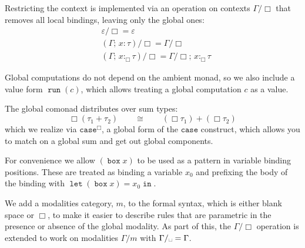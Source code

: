 \documentclass[acmsmall, screen, review, anonymous]{acmart}
\theoremstyle{definition}
\newcommand{\glob}{\mathop{\Box}}
\newcommand{\nothing}{\text{\textvisiblespace}}
\newcommand{\casename}{\mathtt{case}}
\newcommand{\caseboxname}{\casename^{\Box}}
\newcommand{\types}{\mathrel{:}}
\newcommand{\gtypes}{\mathrel{:_{\Box}}}
\newcommand{\cempty}{\varepsilon}
\newcommand{\ccons}[2]{#1;\,#2}
\newcommand{\lbind}[3]{\ccons{#1}{#2\types#3}}
\newcommand{\gbind}[3]{\ccons{#1}{#2\gtypes#3}}
\newcommand{\cdiv}[1]{#1/\Box}
\newcommand{\cmdiv}[1]{#1/m}
\newcommand{\cldiv}[1]{#1/\nothing}
\newcommand{\gboxname}{\mathop{\mathtt{box}}}
\newcommand{\gbox}[1]{\gboxname #1}
\newcommand{\gunbox}[3]{\mathop{\mathtt{let}} (\gbox{#1}) = #2 \mathop{\mathtt{in}} #3}
\newcommand{\grunname}{\mathtt{run}}
\newcommand{\grun}[1]{\mathop{\grunname}(#1)}
\begin{document}
Restricting the context is implemented via an operation on contexts
$\cdiv{\Gamma}$ that removes all local bindings, leaving only the global
ones:
\begin{align*}
  &\cdiv{\cempty} = \cempty \\
  &\cdiv{(\lbind{\Gamma}{x}{\tau})} = \cdiv{\Gamma} \\
  &\cdiv{(\gbind{\Gamma}{x}{\tau})} = \gbind{\cdiv{\Gamma}}{x}{\tau}
\end{align*}

Global computations do not depend on the ambient monad, so we also
include a value form $\grun{c}$, which allows treating a global
computation $c$ as a value.

The global comonad distributes over sum types:
\begin{equation*}
  \glob (\tau_1 + \tau_2)
  \qquad \cong \qquad
  (\glob \tau_1) + (\glob \tau_2)
\end{equation*}
which we realize via $\caseboxname$, a global form of the
$\casename$ construct, which allows you to match on a global sum and get
out global components.

For convenience we allow $(\gbox{x})$ to be used as a pattern in
variable binding positions. These are treated as binding a variable
$x_0$ and prefixing the body of the binding with $\gunbox{x}{x_0}{}$.

We add a modalities category, $m$, to the formal syntax, which is either
blank space or $\glob$, to make it easier to describe rules that are
parametric in the presence or absence of the global modality. As part of
this, the $\cdiv{\Gamma}$ operation is extended to work on modalities
$\cmdiv{\Gamma}$ with $\cldiv{\Gamma} = \Gamma$.
\end{document}
